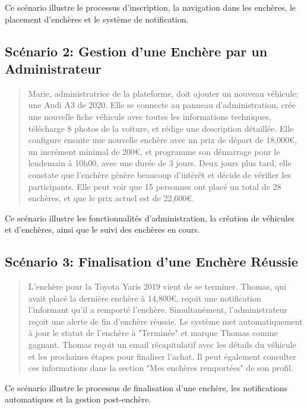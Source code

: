 Ce scénario illustre le processus d'inscription, la navigation dans les enchères, le placement d'enchères et le système de notification.

\subsection{Scénario 2: Gestion d'une Enchère par un Administrateur}

\begin{quote}
Marie, administratrice de la plateforme, doit ajouter un nouveau véhicule: une Audi A3 de 2020. Elle se connecte au panneau d'administration, crée une nouvelle fiche véhicule avec toutes les informations techniques, télécharge 8 photos de la voiture, et rédige une description détaillée. Elle configure ensuite une nouvelle enchère avec un prix de départ de 18,000€, un incrément minimal de 200€, et programme son démarrage pour le lendemain à 10h00, avec une durée de 3 jours. Deux jours plus tard, elle constate que l'enchère génère beaucoup d'intérêt et décide de vérifier les participants. Elle peut voir que 15 personnes ont placé un total de 28 enchères, et que le prix actuel est de 22,600€.
\end{quote}

Ce scénario illustre les fonctionnalités d'administration, la création de véhicules et d'enchères, ainsi que le suivi des enchères en cours.

\subsection{Scénario 3: Finalisation d'une Enchère Réussie}

\begin{quote}
L'enchère pour la Toyota Yaris 2019 vient de se terminer. Thomas, qui avait placé la dernière enchère à 14,800€, reçoit une notification l'informant qu'il a remporté l'enchère. Simultanément, l'administrateur reçoit une alerte de fin d'enchère réussie. Le système met automatiquement à jour le statut de l'enchère à "Terminée" et marque Thomas comme gagnant. Thomas reçoit un email récapitulatif avec les détails du véhicule et les prochaines étapes pour finaliser l'achat. Il peut également consulter ces informations dans la section "Mes enchères remportées" de son profil.
\end{quote}

Ce scénario illustre le processus de finalisation d'une enchère, les notifications automatiques et la gestion post-enchère.

